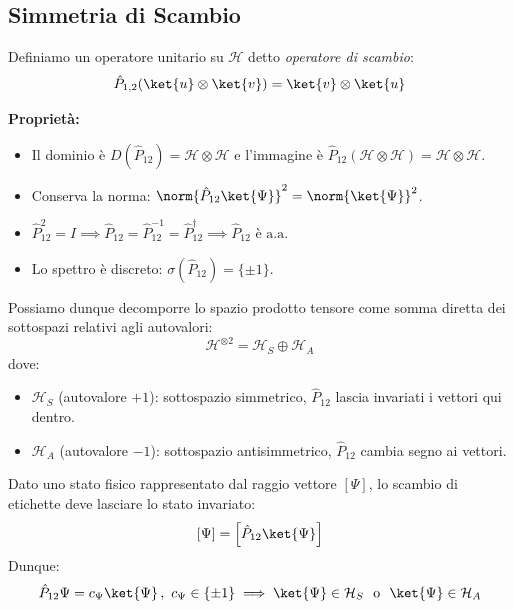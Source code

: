 \subsection{Simmetria di Scambio}
Definiamo un operatore unitario su \(\mathcal{H}\) detto \textit{operatore di scambio}:
\begin{equation}
    \hat{P}_{1,2} ( \ket{u}\otimes\ket{v} ) = \ket{v}\otimes\ket{u}
\end{equation}

\textbf{Proprietà:}
\begin{itemize}
    \item Il dominio è \( D(\hat{P}_{12}) = \mathcal{H} \otimes \mathcal{H} \) e l'immagine è \( \hat{P}_{12}(\mathcal{H} \otimes \mathcal{H}) = \mathcal{H} \otimes \mathcal{H} \).
    \item Conserva la norma: \( \norm{\hat{P}_{12}\ket{\Psi}}^2 = \norm{\ket{\Psi}}^2 \).
    \item 
    \(
    \hat{P}_{12}^2 = I \implies \hat{P}_{12} = \hat{P}_{12}^{-1} = \hat{P}_{12}^\dagger \implies \hat{P}_{12} \text{ è a.a.}
    \)
    \item Lo spettro è discreto: \( \sigma(\hat{P}_{12}) = \{ \pm 1 \} \).
\end{itemize}

Possiamo dunque decomporre lo spazio prodotto tensore come somma diretta dei sottospazi relativi agli autovalori:
\[
\mathcal{H}^{\otimes 2} = \mathcal{H}_S \oplus \mathcal{H}_A
\]
dove:
\begin{itemize}
    \item \( \mathcal{H}_S \) (autovalore \( +1 \)): sottospazio simmetrico, \( \hat{P}_{12} \) lascia invariati i vettori qui dentro.
    \item \( \mathcal{H}_A \) (autovalore \( -1 \)): sottospazio antisimmetrico, \( \hat{P}_{12} \) cambia segno ai vettori.
\end{itemize}

\begin{postulato9}
    Dato uno stato fisico rappresentato dal raggio vettore \(\left[ \Psi \right]\), lo scambio di etichette deve lasciare lo stato invariato:
    \begin{equation}
        \left[ \Psi \right]= \left[ \hat{P}_{12} \ket{\Psi}\right]
    \end{equation}
    Dunque: \[
        \hat{P}_{12} \Psi= c_\Psi\ket{\Psi}\,, \ c_\Psi \in \left\{ \pm 1  \right\} \implies \ket{\Psi} \in \mathcal{H}_S \ \text{ o } \ \ket{\Psi} \in \mathcal{H}_A
    \]
\end{postulato9}

